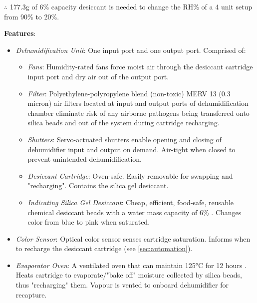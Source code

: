$\therefore$ 177.3g of 6\% capacity desiccant is needed to change the RH\% of a 4 unit setup from 90\% to 20\%.

\textbf{Features}:
\begin{itemize}
    \item \textit{Dehumidification Unit}: One input port and one output port. Comprised of:
    \begin{itemize}
        \item \textit{Fans}: Humidity-rated fans force moist air through the desiccant cartridge input port and dry air out of the output port.
        \item \textit{Filter}: Polyethylene-polyropylene blend (non-toxic) MERV 13 (0.3 micron) air filters \cite{filter} located at input and output ports of dehumidification chamber eliminate risk of any airborne pathogens being transferred onto silica beads and out of the system during cartridge recharging.
        \item \textit{Shutters}: Servo-actuated shutters enable opening and closing of dehumidifier input and output on demand. Air-tight when closed to prevent unintended dehumidification.
        \item \textit{Desiccant Cartridge}: Oven-safe. Easily removable for swapping and "recharging". Contains the silica gel desiccant.
        \item \textit{Indicating Silica Gel Desiccant}: Cheap, efficient, food-safe, reusable chemical desiccant beads with a water mass capacity of 6\% \cite{desiccant}. Changes color from blue to pink when saturated.
    \end{itemize}
    \item \textit{Color Sensor}: Optical color sensor \cite{colorsensor} senses cartridge saturation. Informs when to recharge the desiccant cartridge (see \ref{sec:automation}).
    \item \textit{Evaporator Oven}: A ventilated oven that can maintain 125°C for 12 hours \cite{desiccant}. Heats cartridge to evaporate/"bake off" moisture collected by silica beads, thus "recharging" them. Vapour is vented to onboard dehumidifier for recapture.
\end{itemize}